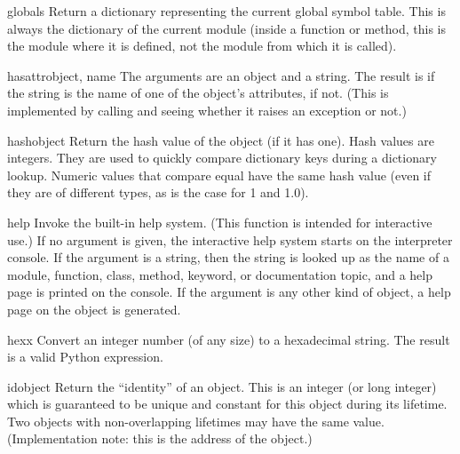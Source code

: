 \begin{funcdesc}{globals}{}
  Return a dictionary representing the current global symbol table.
  This is always the dictionary of the current module (inside a
  function or method, this is the module where it is defined, not the
  module from which it is called).
\end{funcdesc}

\begin{funcdesc}{hasattr}{object, name}
  The arguments are an object and a string.  The result is  if the
  string is the name of one of the object's attributes,  if not.
  (This is implemented by calling  and seeing whether it raises an exception or not.)
\end{funcdesc}

\begin{funcdesc}{hash}{object}
  Return the hash value of the object (if it has one).  Hash values
  are integers.  They are used to quickly compare dictionary
  keys during a dictionary lookup.  Numeric values that compare equal
  have the same hash value (even if they are of different types, as is
  the case for 1 and 1.0).
\end{funcdesc}

\begin{funcdesc}{help}{}
  Invoke the built-in help system.  (This function is intended for
  interactive use.)  If no argument is given, the interactive help
  system starts on the interpreter console.  If the argument is a
  string, then the string is looked up as the name of a module,
  function, class, method, keyword, or documentation topic, and a
  help page is printed on the console.  If the argument is any other
  kind of object, a help page on the object is generated.
\end{funcdesc}

\begin{funcdesc}{hex}{x}
  Convert an integer number (of any size) to a hexadecimal string.
  The result is a valid Python expression.
\end{funcdesc}

\begin{funcdesc}{id}{object}
  Return the ``identity'' of an object.  This is an integer (or long
  integer) which is guaranteed to be unique and constant for this
  object during its lifetime.  Two objects with non-overlapping lifetimes
  may have the same  value.  (Implementation
  note: this is the address of the object.)
\end{funcdesc}

